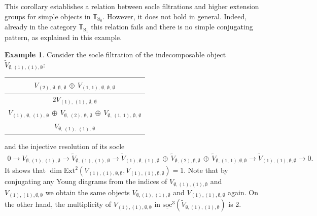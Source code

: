 \documentclass[openany, a4paper]{amsbook}
\theoremstyle{definition}
\newtheorem{exmp}[thm]{Example}
\numberwithin{equation}{chapter}
\newcommand{\T}[1]{{\mathbb{T}}_{\aleph_{#1}}}
\newcommand{\socl}[2]{\underline{\mathrm{soc}}^{#1}({#2})}
\newcommand{\Ext}[4]{\mathrm{Ext}^{#1}_{#2}({#3}, {#4})}
\begin{document}
This corollary establishes a relation between socle filtrations and higher extension groups for simple objects in $\T{0}$. However, it does not hold in general. Indeed, already in the category $\T{1}$ this relation fails and there is no simple conjugating pattern, as explained in this example.

\begin{exmp}
    Consider the socle filtration of the indecomposable object $\tilde{V}_{\emptyset, (1), (1), \emptyset}$:
    \begin{center}
        \begin{tabular}{|c|}
            \hline
            $V_{(2), \,\emptyset, \,\emptyset, \,\emptyset } \, \oplus \, V_{ (1,\,1), \,\emptyset, \,\emptyset, \,\emptyset}$ \\ \hline
            $2 V_{ (1), \,(1), \,\emptyset, \,\emptyset }$  \\ \hline
            $V_{ (1), \,\emptyset, \,(1), \,\emptyset }\,\oplus\,V_{ \emptyset, \,(2), \,\emptyset, \,\emptyset }\,\oplus\,V_{ \emptyset, \,(1,\,1), \,\emptyset, \,\emptyset }$  \\ \hline
            $V_{ \emptyset, \,(1), \,(1), \,\emptyset }$  \\ \hline
        \end{tabular}
    \end{center}
    and the injective resolution of its socle
    \begin{align*}
        0 \to V_{ \emptyset, (1), (1), \emptyset }\to
        \tilde{V}_{ \emptyset, (1), (1), \emptyset }
        \to
        \tilde{V}_{ (1), \emptyset, (1), \emptyset }\,\oplus\,\tilde{V}_{ \emptyset, (2), \emptyset, \emptyset }\,\oplus\,\tilde{V}_{ \emptyset, (1,\,1), \emptyset, \emptyset }
        \to
        \tilde{V}_{ (1), (1), \emptyset, \emptyset }
        \to 0.
    \end{align*}
    It shows that $\dim \Ext{2}{}{V_{ (1), (1), \emptyset, \emptyset }}{V_{ (1), (1), \emptyset, \emptyset }} = 1$. Note that by conjugating any Young diagrams from the indices of $V_{\emptyset, (1), (1), \emptyset}$ and $V_{ (1), (1), \emptyset, \emptyset}$ we obtain the same objects $V_{\emptyset, (1), (1), \emptyset}$ and $V_{ (1), (1), \emptyset, \emptyset}$ again. On the other hand, the multiplicity of $V_{ (1), (1), \emptyset, \emptyset}$ in $\socl{3}{\tilde{V}_{\emptyset, (1), (1), \emptyset}}$ is 2.
\end{exmp}
\end{document}
